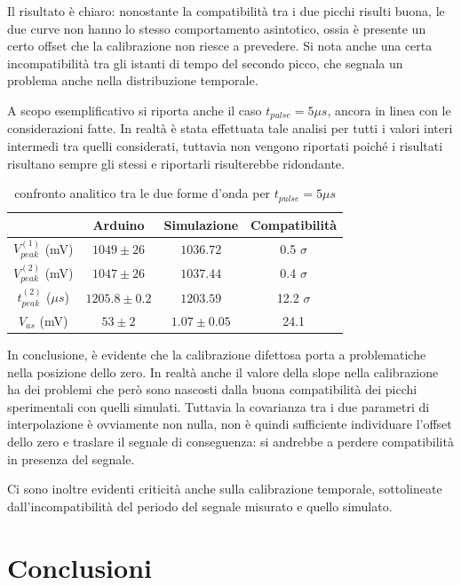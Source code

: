\documentclass{article}
\begin{document}
Il risultato è chiaro: nonostante la compatibilità tra i due picchi risulti buona, le due curve non hanno lo stesso comportamento asintotico, ossia è presente
un certo offset che la calibrazione non riesce a prevedere. Si nota anche una certa incompatibilità tra gli istanti di tempo del secondo picco, che segnala 
un problema anche nella distribuzione temporale.


A scopo esemplificativo si riporta anche il caso $t_{pulse}=5 \mu s$, ancora in linea con le considerazioni fatte. In realtà è stata effettuata tale analisi per tutti 
i valori interi intermedi tra quelli considerati, tuttavia non vengono riportati poiché i risultati risultano sempre gli stessi e riportarli risulterebbe ridondante.

\begin{table}[H]
    \centering
    \begin{tabular}{cccc}
        \toprule
                        & Arduino & Simulazione & Compatibilità \\
        \midrule
        $V_{peak}^{(1)}$ (mV)&   $1049 \pm 26$ & $1036.72$ & 0.5 $\sigma$\\
        $V_{peak}^{(2)}$ (mV)&   $1047 \pm 26$ & $1037.44$ & 0.4 $\sigma$\\
        $t_{peak}^{(2)}$ ($\mu s$)&   $1205.8 \pm 0.2$ & $1203.59$ & 12.2 $\sigma$\\
        $V_{as}$       (mV)&   $53 \pm 2$ & $1.07 \pm 0.05$ & 24.1 \\
        \bottomrule
    \end{tabular}
    \caption{confronto analitico tra le due forme d'onda per $t_{pulse}=5 \mu s$}
\end{table}

In conclusione, è evidente che la calibrazione difettosa porta a problematiche nella posizione dello zero.
In realtà anche il valore della slope nella calibrazione ha dei problemi che però sono nascosti dalla buona compatibilità 
dei picchi sperimentali con quelli simulati. Tuttavia la covarianza tra i due parametri di interpolazione è ovviamente non nulla,
non è quindi sufficiente individuare l'offset dello zero e traslare il segnale di conseguenza: si andrebbe a perdere compatibilità in presenza
del segnale. 

Ci sono inoltre evidenti criticità anche sulla calibrazione temporale, sottolineate dall'incompatibilità del periodo del segnale misurato e quello 
simulato.


\section{Conclusioni}
\end{document}
